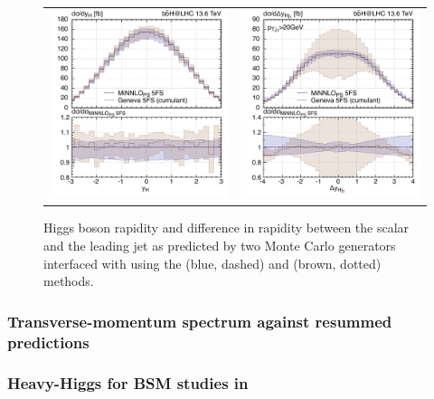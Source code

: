 \documentclass[11pt,a4paper]{article}
\begin{document}
\begin{figure}[t!]
\begin{center}
\begin{tabular}{cc}
\includegraphics[width=.45\textwidth, page=1]{plots/5fs/genevaminnlo/minnloKQvar-geneva-yh.pdf}&
\includegraphics[width=.45\textwidth, page=1]{plots/5fs/genevaminnlo/minnloKQvar-geneva-dyhj.pdf}
\end{tabular}
\vspace*{1ex}
\caption{Higgs boson rapidity and difference in rapidity between the scalar and the leading jet as predicted by two Monte Carlo generators interfaced with  using the \minnlo{} (blue, dashed) and \GENEVA{} (brown, dotted) methods. \label{fig:genevay}}
\end{center}
\end{figure}

\subsubsection{Transverse-momentum spectrum against resummed predictions}

\subsubsection{Heavy-Higgs for BSM studies in \minnlo{}}
\end{document}

